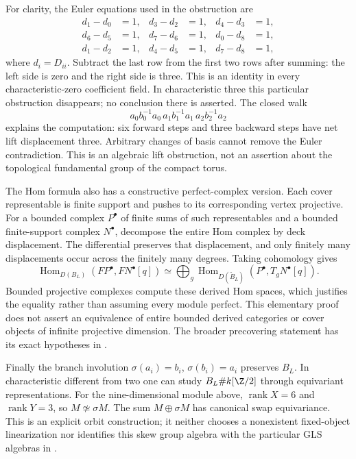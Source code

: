 \documentclass[11pt]{article}
\theoremstyle{definition}\newtheorem{definition}[theorem]{Definition}
\theoremstyle{remark}\newtheorem{remark}[theorem]{Remark}
\begin{document}
For clarity, the Euler equations used in the obstruction are
\begin{align*}
 d_1-d_0&=1,&d_3-d_2&=1,&d_4-d_3&=1,\\
 d_6-d_5&=1,&d_7-d_6&=1,&d_0-d_8&=1,\\
 d_1-d_2&=1,&d_4-d_5&=1,&d_7-d_8&=1,
\end{align*}
where $d_i=D_{ii}$. Subtract the last row from the first two rows after
summing: the left side is zero and the right side is three. This is an
identity in every characteristic-zero coefficient field. In characteristic
three this particular obstruction disappears; no conclusion there is
asserted. The closed walk
\[
 a_0b_0^{-1}a_0\,a_1b_1^{-1}a_1\,a_2b_2^{-1}a_2
\]
explains the computation: six forward steps and three backward steps have
net lift displacement three. Arbitrary changes of basis cannot remove the
Euler contradiction. This is an algebraic lift obstruction, not an
assertion about the topological fundamental group of the compact torus.

The Hom formula also has a constructive perfect-complex version. Each
cover representable is finite support and pushes to its corresponding
vertex projective. For a bounded complex $P^\bullet$ of finite sums of such
representables and a bounded finite-support complex $N^\bullet$, decompose
the entire Hom complex by deck displacement. The differential preserves
that displacement, and only finitely many displacements occur across the
finitely many degrees. Taking cohomology gives
\[
 \operatorname{Hom}_{D(B_L)}(FP^\bullet,FN^\bullet[q])
 \simeq\bigoplus_g
 \operatorname{Hom}_{D(\widetilde B_L)}(P^\bullet,T_gN^\bullet[q]).
\]
Bounded projective complexes compute these derived Hom spaces, which
justifies the equality rather than assuming every module perfect. This
elementary proof does not assert an equivalence of entire bounded derived
categories or cover objects of infinite projective dimension. The broader
precovering statement has its exact hypotheses in
\cite[Theorem~4.28]{CoveringLecture2026}.

Finally the branch involution $\sigma(a_i)=b_i$, $\sigma(b_i)=a_i$
preserves $B_L$. In characteristic different from two one can study
$B_L\#k[\Z/2]$ through equivariant representations. For the nine-dimensional
module above, $\operatorname{rank}X=6$ and $\operatorname{rank}Y=3$, so
$M\not\simeq\sigma M$. The sum $M\oplus\sigma M$ has canonical swap
equivariance. This is an explicit orbit construction; it neither chooses a
nonexistent fixed-object linearization nor identifies this skew group
algebra with the particular GLS algebras in \cite{TameGLS2026}.
\end{document}
